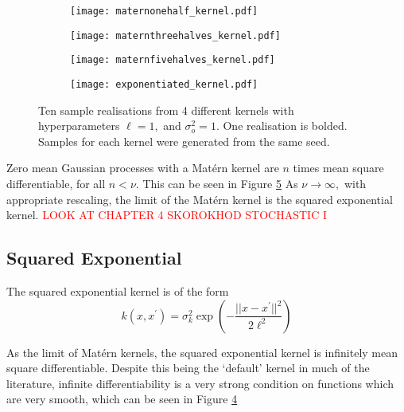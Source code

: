 \begin{figure}[htbp]
    \centering
    \begin{subfigure}[b]{0.5\textwidth}
        \centering
        \texttt{[image: maternonehalf\_kernel.pdf]}
        \label{fig:mat_one_half}
    \end{subfigure}%
    \hfill%
    \begin{subfigure}[b]{0.5\textwidth}
        \centering
        \texttt{[image: maternthreehalves\_kernel.pdf]}
        \label{fig:mat_three_halves}
    \end{subfigure}
    \begin{subfigure}[b]{0.5\textwidth}
        \centering
        \texttt{[image: maternfivehalves\_kernel.pdf]}
        \label{fig:mat_five_halves}
    \end{subfigure}%
    \hfill%
    \begin{subfigure}[b]{0.5\textwidth}
        \centering
        \texttt{[image: exponentiated\_kernel.pdf]}
        \label{fig:squared_exp}
    \end{subfigure}%
    \caption{
        Ten sample realisations from 4 different kernels with hyperparameters
        $\ell = 1,$ and $\sigma^2_o = 1.$ One realisation is bolded. Samples
        for each kernel were generated from the same seed.
    }
    \label{fig:kernels}
\end{figure}

Zero mean Gaussian processes with a Mat\'ern kernel are $n$ times mean square
differentiable, for all $n < \nu.$ This can be seen in Figure \ref{fig:kernels}
As $\nu\to\infty,$ with appropriate
rescaling, the limit of the Mat\'ern kernel is the squared exponential
kernel.\cite[85]{rasmussen_gaussian_2008}
\textcolor{red}{LOOK AT CHAPTER 4 SKOROKHOD STOCHASTIC I}

\subsection*{Squared Exponential}

The squared exponential kernel is of the form
$$
    k(x, x^\prime)
    = \sigma^2_k\exp\left(-\frac{||x - x^\prime||^2}{2\ell^2}\right)
$$

As the limit of Mat\'ern kernels, the squared exponential kernel is infinitely
mean square differentiable. Despite this being the `default' kernel in much of
the literature, infinite differentiability is a very strong condition on
functions which are very smooth, which can be seen in Figure
\ref{fig:squared_exp}


